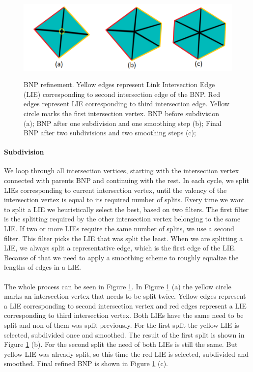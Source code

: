 \begin{figure}[h]
    \centering
    \includegraphics[width=\textwidth]{images/refinement_ilu.png}
    \label{fig:refinement_ilu}
    \caption[BNP refinement]{BNP refinement. Yellow edges represent Link Intersection Edge (LIE) corresponding to second intersection edge of the BNP. Red edges represent LIE corresponding to third intersection edge. Yellow circle marks the first intersection vertex. BNP before subdivision (a); BNP after one subdivision and one smoothing step (b); Final BNP after two subdivisions and two smoothing steps (c);}
\end{figure}

\paragraph{Subdivision}
We loop through all intersection vertices, starting with the intersection vertex connected with parents BNP and continuing with the rest. In each cycle, we split LIEs corresponding to current intersection vertex, until the valency of the intersection vertex is equal to its required number of splits. Every time we want to split a LIE we heuristically select the best, based on two filters. The first filter is the splitting required by the other intersection vertex belonging to the same LIE. If two or more LIEs require the same number of splits, we use a second filter. This filter picks the LIE that was split the least. When we are splitting a LIE, we always split a representative edge, which is the first edge of the LIE. Because of that we need to apply a smoothing scheme to roughly equalize the lengths of edges in a LIE. 

\paragraph{}
The whole process can be seen in Figure \ref{fig:refinement_ilu}. In Figure \ref{fig:refinement_ilu} (a) the yellow circle marks an intersection vertex that needs to be split twice. Yellow edges represent a LIE corresponding to second intersection vertex and red edges represent a LIE corresponding to third intersection vertex. Both LIEs have the same need to be split and non of them was split previously. For the first split the yellow LIE is selected, subdivided once and smoothed. The result of the first split is shown in Figure \ref{fig:refinement_ilu} (b). For the second split the need of both LIEs is still the same. But yellow LIE was already split, so this time the red LIE is selected, subdivided and smoothed. Final refined BNP is shown in Figure \ref{fig:refinement_ilu} (c).

